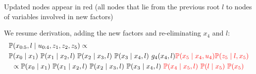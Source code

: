 \documentclass[a4paper]{scrreprt}
\begin{document}
\section{}
Updated nodes appear in red (all nodes that lie from the previous root $l$ to 
 nodes of variables involved in new factors)
\begin{figure}[h]	
\end{figure}\begin{flushright}

\end{flushright}
We resume derivation, adding the new factors and re-eliminating $x_4$ and $l$:
\begin{gather}
	\prob{x_{0:5}, l\mid u_{0:4}, z_1, z_2, z_5} \propto \hfill \\
	 \prob{x_0\mid x_1}~\prob{x_1\mid x_2, l}~\prob{x_2\mid x_3, l}
	~\prob{x_3\mid x_4, l}~g_4(x_4, l) {\color{red}\prob{x_5\mid x_4, u_4} 
	\prob{z_5\mid l, 
	x_5}} \\
	\propto
	\prob{x_0\mid x_1}~\prob{x_1\mid x_2, l}~\prob{x_2\mid x_3, l}
		~\prob{x_3\mid x_4, l}~{\color{red}\prob{x_4\mid x_5, l}~\prob{l\mid 
		x_5}~\prob{x_5}}
\end{gather}
\end{document}
